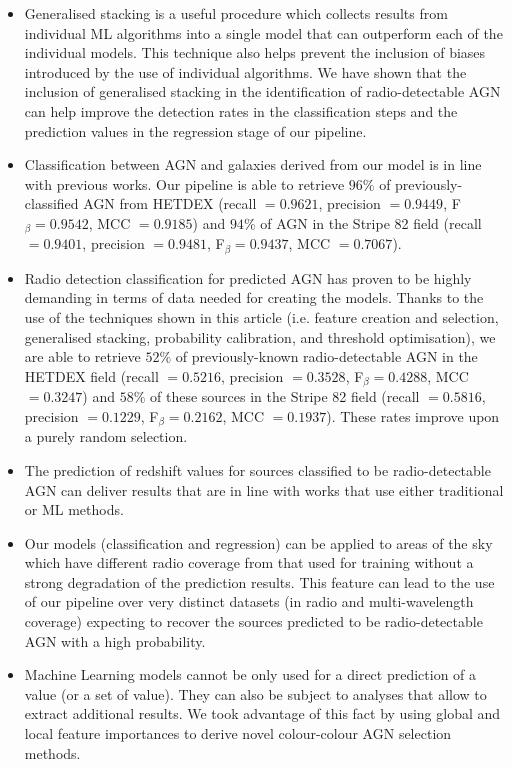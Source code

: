 \documentclass{aa}
\begin{document}
\begin{itemize}
\item Generalised stacking is a useful procedure which collects results from individual ML algorithms into a single model that can outperform each of the individual models. This technique also helps prevent the inclusion of biases introduced by the use of individual algorithms. We have shown that the inclusion of generalised stacking in the identification of radio-detectable AGN can help improve the detection rates in the classification steps and the prediction values in the regression stage of our pipeline.
\item Classification between AGN and galaxies derived from our model is in line with previous works. Our pipeline is able to retrieve $96\%$ of previously-classified AGN from HETDEX (recall $= 0.9621$, precision $= 0.9449$, F$_{\beta} = 0.9542$, MCC $= 0.9185$) and $94\%$ of AGN in the Stripe 82 field (recall $= 0.9401$, precision $= 0.9481$, F$_{\beta} = 0.9437$, MCC $= 0.7067$).
\item Radio detection classification for predicted AGN has proven to be highly demanding in terms of data needed for creating the models. Thanks to the use of the techniques shown in this article (i.e. feature creation and selection, generalised stacking, probability calibration, and threshold optimisation), we are able to retrieve $52\%$ of previously-known radio-detectable AGN in the HETDEX field (recall $= 0.5216$, precision $= 0.3528$, F$_{\beta} = 0.4288$, MCC $= 0.3247$) and $58\%$ of these sources in the Stripe 82 field (recall $= 0.5816$, precision $= 0.1229$, F$_{\beta} = 0.2162$, MCC $= 0.1937$). These rates improve upon a purely random selection.
\item The prediction of redshift values for sources classified to be radio-detectable AGN can deliver results that are in line with works that use either traditional or ML methods.
\item Our models (classification and regression) can be applied to areas of the sky which have different radio coverage from that used for training without a strong degradation of the prediction results. This feature can lead to the use of our pipeline over very distinct datasets (in radio and multi-wavelength coverage) expecting to recover the sources predicted to be radio-detectable AGN with a high probability.
\item Machine Learning models cannot be only used for a direct prediction of a value (or a set of value). They can also be subject to analyses that allow to extract additional results. We took advantage of this fact by using global and local feature importances to derive novel colour-colour AGN selection methods.
\end{itemize}
\end{document}
